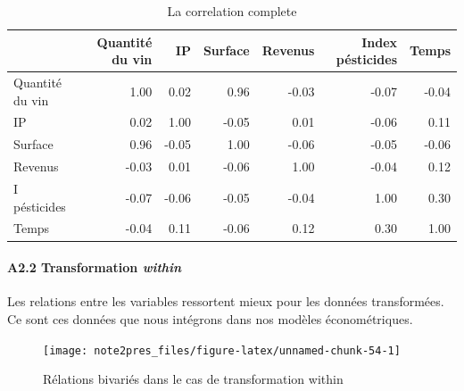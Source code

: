 \documentclass[11pt,]{article}
\let\oldparagraph\paragraph
\renewcommand{\paragraph}[1]{\oldparagraph{#1}\mbox{}}
\begin{document}
\FloatBarrier

\FloatBarrier

\begin{table}[ht]
\centering
\begin{tabular}{l|rrrrrr}
  \hline
 & Quantité du vin & IP & Surface & Revenus & Index pésticides & Temps \\ 
  \hline
Quantité du vin & 1.00 & 0.02 & 0.96 & -0.03 & -0.07 & -0.04 \\ 
  IP & 0.02 & 1.00 & -0.05 & 0.01 & -0.06 & 0.11 \\ 
  Surface & 0.96 & -0.05 & 1.00 & -0.06 & -0.05 & -0.06 \\ 
  Revenus & -0.03 & 0.01 & -0.06 & 1.00 & -0.04 & 0.12 \\ 
  I pésticides & -0.07 & -0.06 & -0.05 & -0.04 & 1.00 & 0.30 \\ 
  Temps & -0.04 & 0.11 & -0.06 & 0.12 & 0.30 & 1.00 \\ 
   \hline
\end{tabular}
\caption{La correlation complete} 
\end{table}

\FloatBarrier

\newpage

\hypertarget{a2.2-transformation-within}{%
\paragraph{\texorpdfstring{A2.2 Transformation
\emph{within}}{A2.2 Transformation within}}\label{a2.2-transformation-within}}

Les relations entre les variables ressortent mieux pour les données
transformées. Ce sont ces données que nous intégrons dans nos modèles
économétriques.

\FloatBarrier

\begin{figure}[!htbp]

{\centering \texttt{[image: note2pres\_files/figure-latex/unnamed-chunk-54-1]} 

}

\caption{Rélations bivariés dans le cas de transformation within}\label{fig:unnamed-chunk-54}
\end{figure}

\FloatBarrier

\FloatBarrier
\end{document}
